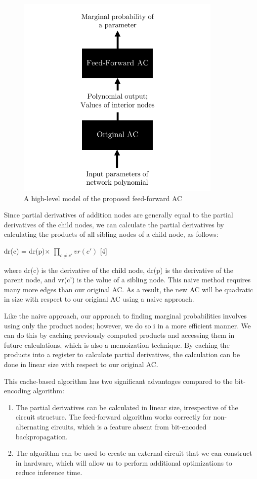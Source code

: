 \documentclass[11pt,a4paper, final, twoside]{article}
\theoremstyle{proposition}
\theoremstyle{definition}
\theoremstyle{remark}
\numberwithin{equation}{section}
\begin{document}
\begin{figure}[h]
    \caption{A high-level model of the proposed feed-forward AC}
    \centering
    \includegraphics[width=10cm]{feedforward_example.pdf}
\end{figure}
\newpage

Since partial derivatives of addition nodes are generally equal to the partial derivatives of the child nodes, we can calculate the partial derivatives by calculating the products of all sibling nodes of a child node, as follows: \newline\centerline{dr(c) = dr(p)$\times$ $\prod\limits_{c \neq c'}^{} vr(c')$ [4]}\newline where dr(c) is the derivative of the child node, dr(p) is the derivative of the parent node, and vr(c') is the value of a sibling node. This naive method requires many more edges than our original AC. As a result, the new AC will be quadratic in size with respect to our original AC using a naive approach.

Like the naive approach, our approach to finding marginal probabilities involves using only the product nodes; however, we do so i in a more efficient manner. We can do this by caching previously computed products and accessing them in future calculations, which is also a memoization technique. By caching the products into a register to calculate partial derivatives, the calculation can be done in linear size with respect to our original AC. 

This cache-based algorithm has two significant advantages compared to the bit-encoding algorithm:
\begin{enumerate}
\item The partial derivatives can be calculated in linear size, irrespective of the circuit structure. The feed-forward algorithm works correctly for non-alternating circuits, which is a feature absent from bit-encoded backpropagation. 
\item The algorithm can be used to create an external circuit that we can construct in hardware, which will allow us to perform additional optimizations to reduce inference time. 
\end{enumerate}
\end{document}
